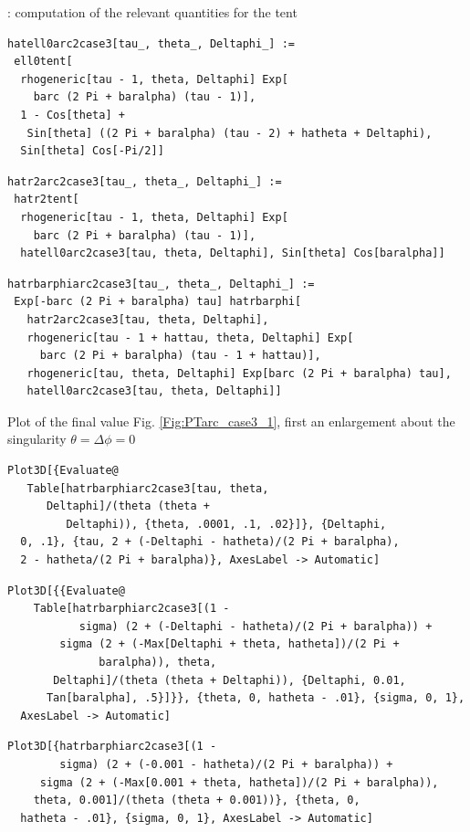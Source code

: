 \documentclass[reqno]{amsart}
\theoremstyle{definition} \newtheorem{definition}{Definition}[section]
\theoremstyle{definition} \newtheorem{remark}[definition]{Remark}
\theoremstyle{plain} \newtheorem{lemma}[definition]{Lemma}
\theoremstyle{plain} \newtheorem{proposition}[definition]{Proposition}
\theoremstyle{plain} \newtheorem{theorem}[definition]{Theorem}
\theoremstyle{plain} \newtheorem{corollary}[definition]{Corollary}
\theoremstyle{definition} \newtheorem{example}[definition]{Example}
\theoremstyle{plain} \newtheorem{claim}[clai]{Claim}
\theoremstyle{definition} \newtheorem{assumption}[definition]{Assumption}
\theoremstyle{definition} \newtheorem{observation}[definition]{Observation}
\newcommand{\1}{\mathbbm 1}
\newcommand{\smed}{\medskip}
\numberwithin{equation}{section} %
\theoremstyle{plain} \newtheorem*{theorem*}{Theorem}
\theoremstyle{plain} \newtheorem{mthm}[maintheorem]{Main Theorem}
\theoremstyle{plain} \newtheorem*{mthm*}{Main Theorem}
\theoremstyle{plain} \newtheorem*{conjecture*}{Conjecture}
\theoremstyle{plain} \newtheorem{conjecture}[definition]{Conjecture}
\theoremstyle{plain} \newtheorem*{problem*}{Problem}
\begin{document}
: computation of the relevant quantities for the tent
\smed
\begin{verbatim}
hatell0arc2case3[tau_, theta_, Deltaphi_] := 
 ell0tent[
  rhogeneric[tau - 1, theta, Deltaphi] Exp[
    barc (2 Pi + baralpha) (tau - 1)], 
  1 - Cos[theta] + 
   Sin[theta] ((2 Pi + baralpha) (tau - 2) + hatheta + Deltaphi), 
  Sin[theta] Cos[-Pi/2]]
\end{verbatim}
\begin{verbatim}
hatr2arc2case3[tau_, theta_, Deltaphi_] := 
 hatr2tent[
  rhogeneric[tau - 1, theta, Deltaphi] Exp[
    barc (2 Pi + baralpha) (tau - 1)], 
  hatell0arc2case3[tau, theta, Deltaphi], Sin[theta] Cos[baralpha]]
\end{verbatim}
\begin{verbatim}
hatrbarphiarc2case3[tau_, theta_, Deltaphi_] := 
 Exp[-barc (2 Pi + baralpha) tau] hatrbarphi[
   hatr2arc2case3[tau, theta, Deltaphi], 
   rhogeneric[tau - 1 + hattau, theta, Deltaphi] Exp[
     barc (2 Pi + baralpha) (tau - 1 + hattau)], 
   rhogeneric[tau, theta, Deltaphi] Exp[barc (2 Pi + baralpha) tau], 
   hatell0arc2case3[tau, theta, Deltaphi]]
\end{verbatim}
\smed
Plot of the final value Fig. \ref{Fig:PTarc_case3_1}, first an enlargement about the singularity $\theta = \Delta \phi = 0$
\smed
\begin{verbatim}
Plot3D[{Evaluate@
   Table[hatrbarphiarc2case3[tau, theta, 
      Deltaphi]/(theta (theta + 
         Deltaphi)), {theta, .0001, .1, .02}]}, {Deltaphi, 
  0, .1}, {tau, 2 + (-Deltaphi - hatheta)/(2 Pi + baralpha), 
  2 - hatheta/(2 Pi + baralpha)}, AxesLabel -> Automatic]
\end{verbatim}
\begin{verbatim}
Plot3D[{{Evaluate@
    Table[hatrbarphiarc2case3[(1 - 
           sigma) (2 + (-Deltaphi - hatheta)/(2 Pi + baralpha)) + 
        sigma (2 + (-Max[Deltaphi + theta, hatheta])/(2 Pi + 
              baralpha)), theta, 
       Deltaphi]/(theta (theta + Deltaphi)), {Deltaphi, 0.01, 
      Tan[baralpha], .5}]}}, {theta, 0, hatheta - .01}, {sigma, 0, 1},
  AxesLabel -> Automatic]
\end{verbatim}
\begin{verbatim}
Plot3D[{hatrbarphiarc2case3[(1 - 
        sigma) (2 + (-0.001 - hatheta)/(2 Pi + baralpha)) + 
     sigma (2 + (-Max[0.001 + theta, hatheta])/(2 Pi + baralpha)), 
    theta, 0.001]/(theta (theta + 0.001))}, {theta, 0, 
  hatheta - .01}, {sigma, 0, 1}, AxesLabel -> Automatic]
\end{verbatim}
\end{document}
